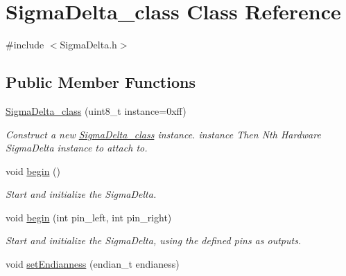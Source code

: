 \hypertarget{classSigmaDelta__class}{\section{Sigma\-Delta\-\_\-class Class Reference}
\label{classSigmaDelta__class}
}


{\ttfamily \#include $<$Sigma\-Delta.\-h$>$}

\subsection*{Public Member Functions}
\begin{DoxyCompactItemize}
\item 
\hypertarget{classSigmaDelta__class_a18d7f310eec6257847d3f3205f843522}{\hyperlink{classSigmaDelta__class_a18d7f310eec6257847d3f3205f843522}{Sigma\-Delta\-\_\-class} (uint8\-\_\-t instance=0xff)}\label{classSigmaDelta__class_a18d7f310eec6257847d3f3205f843522}

\begin{DoxyCompactList}\small\item\em Construct a new \hyperlink{classSigmaDelta__class}{Sigma\-Delta\-\_\-class} instance.  instance Then Nth Hardware Sigma\-Delta instance to attach to. \end{DoxyCompactList}\item 
\hypertarget{classSigmaDelta__class_a30685e4ffc84e6d5132ee86fc9123078}{void \hyperlink{classSigmaDelta__class_a30685e4ffc84e6d5132ee86fc9123078}{begin} ()}\label{classSigmaDelta__class_a30685e4ffc84e6d5132ee86fc9123078}

\begin{DoxyCompactList}\small\item\em Start and initialize the Sigma\-Delta. \end{DoxyCompactList}\item 
\hypertarget{classSigmaDelta__class_a7e727b16354a337a0a0154ecf8bc213d}{void \hyperlink{classSigmaDelta__class_a7e727b16354a337a0a0154ecf8bc213d}{begin} (int pin\-\_\-left, int pin\-\_\-right)}\label{classSigmaDelta__class_a7e727b16354a337a0a0154ecf8bc213d}

\begin{DoxyCompactList}\small\item\em Start and initialize the Sigma\-Delta, using the defined pins as outputs. \end{DoxyCompactList}\item 
\hypertarget{classSigmaDelta__class_a138d461312c4d29832e961cd492bb4b4}{void \hyperlink{classSigmaDelta__class_a138d461312c4d29832e961cd492bb4b4}{set\-Endianness} (endian\-\_\-t endianess)}\label{classSigmaDelta__class_a138d461312c4d29832e961cd492bb4b4}


\end{DoxyCompactItemize}
